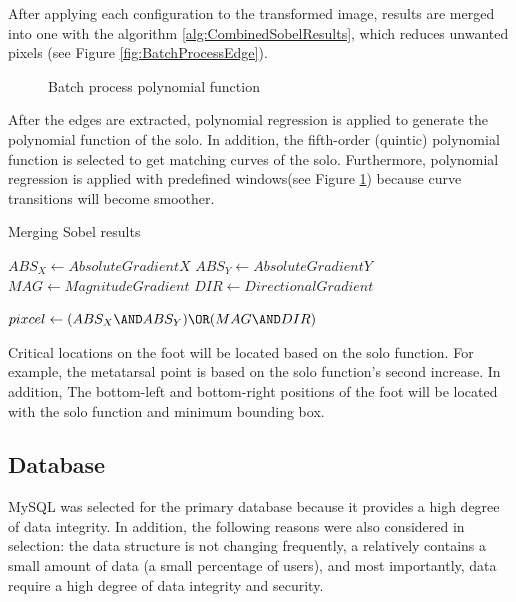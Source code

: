After applying each configuration to the transformed image, results are merged into one with the algorithm \ref{alg:CombinedSobelResults}, which reduces unwanted pixels (see Figure \ref{fig:BatchProcessEdge}). 

\begin{figure}[htbp]
\centering
{}
\caption{Batch process polynomial function}
\label{fig:BatchProcessLine}
\end{figure}

After the edges are extracted, polynomial regression is applied to generate the polynomial function of the solo. In addition, the fifth-order (quintic) polynomial function is selected to get matching curves of the solo. Furthermore, polynomial regression is applied with predefined windows(see Figure \ref{fig:BatchProcessLine}) because curve transitions will become smoother.

\begin{algorithm}
\caption{Merging Sobel results}\label{alg:CombinedSobelResults}
\begin{algorithmic}

\STATE $ABS_X \gets Absolute Gradient X$
\STATE $ABS_Y \gets Absolute Gradient Y$
\STATE $MAG \gets Magnitude Gradient$
\STATE $DIR \gets Directional Gradient$

    \STATE $pixcel \gets (ABS_X \AND ABS_Y) \OR (MAG \AND DIR)$
\ENDFOR

\end{algorithmic}
\end{algorithm}

Critical locations on the foot will be located based on the solo function. For example, the metatarsal point is based on the solo function's second increase. In addition, The bottom-left and bottom-right positions of the foot will be located with the solo function and minimum bounding box.

\subsection{Database} \label{sec:StudyIDatabase}

MySQL was selected for the primary database because it provides a high degree of data integrity. In addition, the following reasons were also considered in selection: the data structure is not changing frequently, a relatively contains a small amount of data (a small percentage of users), and most importantly, data require a high degree of data integrity and security.

